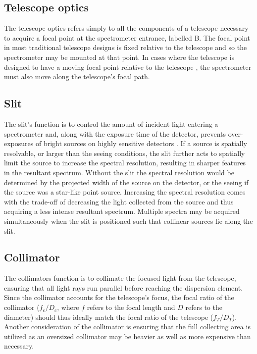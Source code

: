 \subsection{Telescope optics}

The telescope optics refers simply to all the components of a telescope necessary to acquire a focal point at the spectrometer entrance, labelled B. The focal point in most traditional telescope designs is fixed relative to the telescope and so the spectrometer may be mounted at that point. In cases where the telescope is designed to have a moving focal point relative to the telescope \cite[see][]{Arecibo, HET, SALT_design}, the spectrometer must also move along the telescope's focal path.


\subsection{Slit}

The slit's function is to control the amount of incident light entering a spectrometer and, along with the exposure time of the detector, prevents over-exposures of bright sources on highly sensitive detectors \citep{TonkPracAmSpec}. If a source is spatially resolvable, or larger than the seeing conditions, the slit further acts to spatially limit the source to increase the spectral resolution, resulting in sharper features in the resultant spectrum. Without the slit the spectral resolution would be determined by the projected width of the source on the detector, or the seeing if the source was a star-like point source. Increasing the spectral resolution comes with the trade-off of decreasing the light collected from the source and thus acquiring a less intense resultant spectrum. Multiple spectra may be acquired simultaneously when the slit is positioned such that collinear sources lie along the slit.


\subsection{Collimator}

The collimators function is to collimate the focused light from the telescope, ensuring that all light rays run parallel before reaching the dispersion element. Since the collimator accounts for the telescope's focus, the focal ratio of the collimator ($f_{c} / D_{c}$, where $f$ refers to the focal length and $D$ refers to the diameter) should thus ideally match the focal ratio of the telescope ($f_{T} / D_{T}$). Another consideration of the collimator is ensuring that the full collecting area is utilized as an oversized collimator may be heavier as well as more expensive than necessary.

